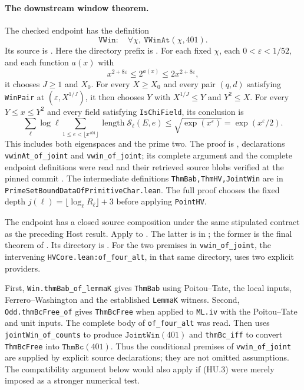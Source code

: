 \paragraph{The downstream window theorem.}
The checked endpoint has the definition
\[
 \texttt{VWin}:\quad
       \forall\chi,\ \texttt{VWinAt}(\chi,401).
\]
Its source is .
Here the directory prefix is
.
For each fixed $\chi$, each $0<\varepsilon<1/52$, and each function
$a(x)$ with
\[
 x^{2+8\varepsilon}\le 2^{a(x)}
      \le 2x^{2+8\varepsilon},
\]
it chooses $J\ge1$ and $X_0$.  For every $X\ge X_0$ and every
pair $(q,d)$ satisfying \texttt{WinPair} at
$(\varepsilon,X^{1/J})$, it then chooses $Y$ with
$X^{1/J}\le Y$ and $Y^2\le X$.  For every $Y\le x\le Y^2$
and every field satisfying \texttt{IsChiField}, its conclusion is
\[
 \sum_{\ell}\log\ell
     \sum_{1\le e<\lfloor x^{401}\rfloor}
           \operatorname{length}\mathcal S_\ell(E,e)
      \le \sqrt{\exp(x^\varepsilon)}
      =\exp(x^\varepsilon/2).
 \tag{HU.3}
\]
This includes both eigenspaces and the prime two.  The proof is
,
declarations \texttt{vwinAt\_of\_joint} and
\texttt{vwin\_of\_joint}; its complete argument and the
complete endpoint definitions were read and their retrieved source
blobs verified at the pinned commit \cite{K17PinnedLeanMirror}.
The intermediate definitions \texttt{ThmBab,ThmHV,JointWin} are in
\texttt{PrimeSetBoundDataOfPrimitiveChar.lean}.
The full proof 
chooses the fixed depth
$j(\ell)=\lfloor\log_\ell R_\ell\rfloor+3$ before applying
\texttt{PointHV}.

\begin{sloppypar}
The endpoint has a closed source composition under the same stipulated
contract as the preceding Host result.  Apply
to .
The latter is in ; the former
is the final theorem of .
Its directory is
\allowbreak%
.
For the two premises in \texttt{vwin\_of\_joint}, the intervening
\texttt{HVCore.lean:of\_four\_alt}, in that same directory,
uses two explicit providers.

First, \texttt{Win.thmBab\_of\_lemmaK} gives \texttt{ThmBab}
using Poitou--Tate, the local inputs, Ferrero--Washington and
the established \texttt{LemmaK} witness.
Second, \texttt{Odd.thmBcFree\_of} gives \texttt{ThmBcFree}
when applied to \texttt{ML.iv} with the Poitou--Tate and unit inputs.
The complete body of \texttt{of\_four\_alt} was read.
Then 
uses \texttt{jointWin\_of\_counts} to produce
$\texttt{JointWin}(401)$ and \texttt{thmBc\_iff} to convert
\texttt{ThmBcFree} into $\texttt{ThmBc}(401)$.
Thus the conditional premises of \texttt{vwin\_of\_joint} are
supplied by explicit source declarations; they are not omitted
assumptions.  The compatibility argument below would also apply
if (HU.3) were merely imposed as a stronger numerical test.
\end{sloppypar}

